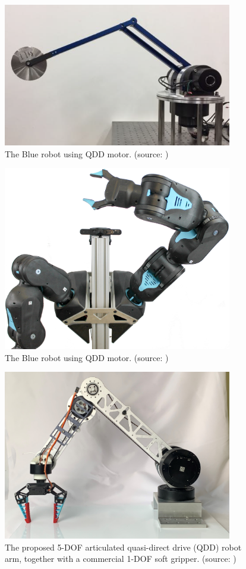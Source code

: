 \begin{figure}[h]
  \centering
  \includegraphics[width=10cm]{images/haikei/3DofArm.png}
  \caption{The Blue robot using QDD motor. (source: \cite{飯塚浩太2021})}
  \label{fig:3DofArm}
\end{figure}
\begin{figure}[h]
  \centering
  \includegraphics[width=10cm]{images/haikei/twoArmTeaser.jpg}
  \caption{The Blue robot using QDD motor. (source: \cite{Blue:online})}
  \label{fig:blue}
\end{figure}
\begin{figure}[h]
  \centering
  \includegraphics[width=10cm]{images/haikei/qddarm.png}
  \caption{The proposed 5-DOF articulated quasi-direct drive (QDD) robot arm,
  together with a commercial 1-DOF soft gripper. (source: \cite{10106520})}
  \label{fig:qddarm}
\end{figure}
\clearpage